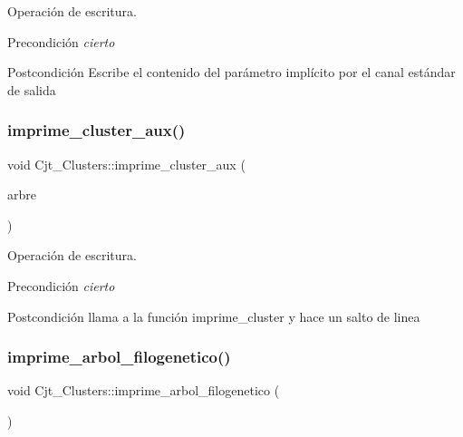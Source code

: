 Operación de escritura. 

\begin{DoxyPrecond}{Precondición}
{\itshape cierto} 
\end{DoxyPrecond}
\begin{DoxyPostcond}{Postcondición}
Escribe el contenido del parámetro implícito por el canal estándar de salida 
\end{DoxyPostcond}
\mbox{\label{class_cjt___clusters_a19510eceda5d5bf39d7091a28bf5f00c}} 
\subsubsection{\texorpdfstring{imprime\+\_\+cluster\+\_\+aux()}{imprime\_cluster\_aux()}}
{\footnotesize\ttfamily void Cjt\+\_\+\+Clusters\+::imprime\+\_\+cluster\+\_\+aux (\begin{DoxyParamCaption}\item[{\hyperlink{class_bin_tree}{Bin\+Tree}$<$ pair$<$ string, double $>$$>$ \&}]{arbre }\end{DoxyParamCaption})}



Operación de escritura. 

\begin{DoxyPrecond}{Precondición}
{\itshape cierto} 
\end{DoxyPrecond}
\begin{DoxyPostcond}{Postcondición}
llama a la función imprime\+\_\+cluster y hace un salto de linea 
\end{DoxyPostcond}
\mbox{\label{class_cjt___clusters_a95262506a2fdc5455ce104fb84649ee9}} 
\subsubsection{\texorpdfstring{imprime\+\_\+arbol\+\_\+filogenetico()}{imprime\_arbol\_filogenetico()}}
{\footnotesize\ttfamily void Cjt\+\_\+\+Clusters\+::imprime\+\_\+arbol\+\_\+filogenetico (\begin{DoxyParamCaption}{ }\end{DoxyParamCaption})}



